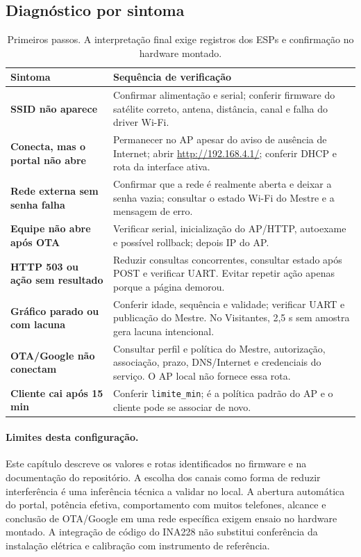 \subsection{Diagnóstico por sintoma}\label{sec:diagnostico-wifi}
\begin{table}[htbp]\centering\small
\begin{tabularx}{\textwidth}{>{\bfseries}p{4.4cm}X}
\toprule
Sintoma & Sequência de verificação\\
\midrule
SSID não aparece & Confirmar alimentação e serial; conferir firmware do satélite correto, antena, distância, canal e falha do driver Wi-Fi.\\
Conecta, mas o portal não abre & Permanecer no AP apesar do aviso de ausência de Internet; abrir \url{http://192.168.4.1/}; conferir DHCP e rota da interface ativa.\\
Rede externa sem senha falha & Confirmar que a rede é realmente aberta e deixar a senha vazia; consultar o estado Wi-Fi do Mestre e a mensagem de erro.\\
Equipe não abre após OTA & Verificar serial, inicialização do AP/HTTP, autoexame e possível rollback; depois IP do AP.\\
HTTP 503 ou ação sem resultado & Reduzir consultas concorrentes, consultar estado após POST e verificar UART. Evitar repetir ação apenas porque a página demorou.\\
Gráfico parado ou com lacuna & Conferir idade, sequência e validade; verificar UART e publicação do Mestre. No Visitantes, 2,5 s sem amostra gera lacuna intencional.\\
OTA/Google não conectam & Consultar perfil e política do Mestre, autorização, associação, prazo, DNS/Internet e credenciais do serviço. O AP local não fornece essa rota.\\
Cliente cai após 15 min & Conferir \texttt{limite\_min}; é a política padrão do AP e o cliente pode se associar de novo.\\
\bottomrule
\end{tabularx}
\caption{Primeiros passos. A interpretação final exige registros dos ESPs e confirmação no hardware montado.}\label{tab:diagnostico-wifi}
\end{table}

\paragraph{Limites desta configuração.}
Este capítulo descreve os valores e rotas identificados no firmware e na documentação do repositório. A escolha dos canais como forma de reduzir interferência é uma inferência técnica a validar no local. A abertura automática do portal, potência efetiva, comportamento com muitos telefones, alcance e conclusão de OTA/Google em uma rede específica exigem ensaio no hardware montado. A integração de código do INA228 não substitui conferência da instalação elétrica e calibração com instrumento de referência.

